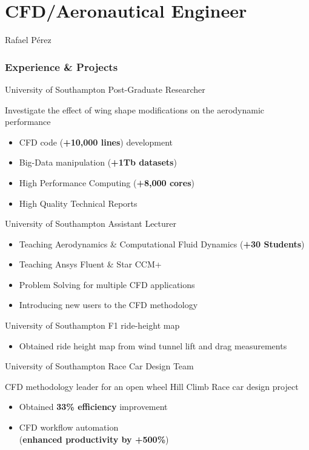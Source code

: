 \documentclass[fontsize=10pt]{tccv}
\begin{document}
\part{CFD/Aeronautical Engineer}{Rafael P\'erez}

\section{Experience \& Projects}
\begin{eventlist}
     {University of Southampton}
     {Post-Graduate Researcher}

Investigate the effect of wing shape modifications on
the aerodynamic performance
\begin{itemize}
	\itemsep -1pt
	\item CFD code (\textbf{+10,000 lines}) development
	\item Big-Data manipulation (\textbf{+1Tb datasets})
	\item High Performance Computing (\textbf{+8,000 cores})
	\item High Quality Technical Reports
\end{itemize}

	{University of Southampton}
	{Assistant Lecturer}
\begin{itemize}
	\itemsep -1pt
	\item Teaching Aerodynamics \& Computational Fluid Dynamics (\textbf{+30 Students})
	\item Teaching Ansys Fluent \& Star CCM+
	\item Problem Solving for multiple CFD applications
	\item Introducing new users to the CFD methodology
\end{itemize}

     {University of Southampton}
     {F1 ride-height map}
     \begin{itemize}
	\itemsep -1pt
     	\item Obtained ride height map from wind tunnel lift and drag measurements
     \end{itemize}

     {University of Southampton}
     {Race Car Design Team}

CFD methodology leader for an open wheel Hill Climb Race car design project
     \begin{itemize}
	\itemsep -1pt
     	\item Obtained \textbf{33\% efficiency} improvement
     	\item CFD workflow automation \\(\textbf{enhanced productivity by +500\%})
     \end{itemize}


\end{eventlist}
\end{document}
